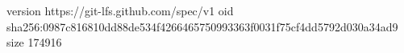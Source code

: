 version https://git-lfs.github.com/spec/v1
oid sha256:0987c816810dd88de534f4266465750993363f0031f75cf4dd5792d030a34ad9
size 174916
